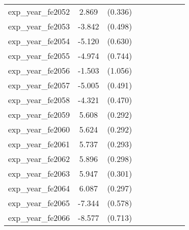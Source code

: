 {\begin{tabular}{l*{4}{cc}}
exp\_year\_fe2052&    2.869\sym{***}&  (0.336)&                  &         &                  &         &                  &         \\
exp\_year\_fe2053&   -3.842\sym{***}&  (0.498)&                  &         &                  &         &                  &         \\
exp\_year\_fe2054&   -5.120\sym{***}&  (0.630)&                  &         &                  &         &                  &         \\
exp\_year\_fe2055&   -4.974\sym{***}&  (0.744)&                  &         &                  &         &                  &         \\
exp\_year\_fe2056&   -1.503         &  (1.056)&                  &         &                  &         &                  &         \\
exp\_year\_fe2057&   -5.005\sym{***}&  (0.491)&                  &         &                  &         &                  &         \\
exp\_year\_fe2058&   -4.321\sym{***}&  (0.470)&                  &         &                  &         &                  &         \\
exp\_year\_fe2059&    5.608\sym{***}&  (0.292)&                  &         &                  &         &                  &         \\
exp\_year\_fe2060&    5.624\sym{***}&  (0.292)&                  &         &                  &         &                  &         \\
exp\_year\_fe2061&    5.737\sym{***}&  (0.293)&                  &         &                  &         &                  &         \\
exp\_year\_fe2062&    5.896\sym{***}&  (0.298)&                  &         &                  &         &                  &         \\
exp\_year\_fe2063&    5.947\sym{***}&  (0.301)&                  &         &                  &         &                  &         \\
exp\_year\_fe2064&    6.087\sym{***}&  (0.297)&                  &         &                  &         &                  &         \\
exp\_year\_fe2065&   -7.344\sym{***}&  (0.578)&                  &         &                  &         &                  &         \\
exp\_year\_fe2066&   -8.577\sym{***}&  (0.713)&                  &         &                  &         &                  &         \\

\end{tabular}}
